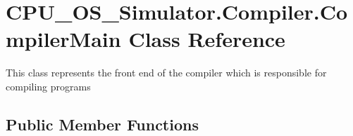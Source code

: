 \hypertarget{class_c_p_u___o_s___simulator_1_1_compiler_1_1_compiler_main}{}\section{C\+P\+U\+\_\+\+O\+S\+\_\+\+Simulator.\+Compiler.\+Compiler\+Main Class Reference}
\label{class_c_p_u___o_s___simulator_1_1_compiler_1_1_compiler_main}


This class represents the front end of the compiler which is responsible for compiling programs  


\subsection*{Public Member Functions}
